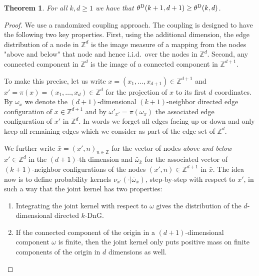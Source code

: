 \documentclass[oneside]{amsart}
\newtheorem{theorem}{Theorem}[section]
\theoremstyle{definition}
\newcommand{\1}{\mathbbm{1}}
\newcommand{\0}{\mathbf{o}}
\newcommand{\Z}{\mathbb{Z}}
\numberwithin{equation}{section}
\begin{document}
\begin{theorem}\label{theorem-3322}
For all $k,d\ge1$ we have that $\theta^{\rm D}(k+1,d+1)\ge \theta^{\rm D}(k,d)$.
\end{theorem}
\begin{proof}
We use a randomized coupling approach. The coupling is designed to have the following two key properties. First, using the additional dimension, the edge distribution of a node in $\Z^d$ is the image measure of a mapping from the nodes "above and below" that node and hence i.i.d.\ over the nodes in $\Z^d$. Second, any connected component in $\Z^d$ is the image of a connected component in $\Z^{d+1}$.

To make this precise, let us write $x=(x_1,\dots,x_{d+1})\in \Z^{d+1}$ and $x'=\pi(x)=(x_1,\dots, x_d)\in \Z^d$ for the projection of $x$ to its first $d$ coordinates. By $\omega_{x}$ we denote the $(d+1)$-dimensional $(k+1)$-neighbor directed edge configuration of $x\in \Z^{d+1}$ and by $\omega'_{x'}=\pi(\omega_{x})$ the associated edge configuration of $x'$ in $\Z^d$. In words we forget all edges facing up or down and only keep all remaining edges which we consider as part of the edge set of $\Z^d$. 

We further write $\bar x=(x',n)_{n\in\Z}$ for the vector of nodes {\em above and below} $x'\in \Z^d$ in the $(d+1)$-th dimension and $\bar\omega_{\bar x}$ for the associated vector of $(k+1)$-neighbor configurations of the nodes $(x',n)\in \Z^{d+1}$ in $\bar x$. The idea now is to define probability kernels $\nu_{x'}(\cdot|\bar\omega_{\bar x})$, step-by-step with respect to $x'$, in such a way that the joint kernel has two properties:
\begin{enumerate}
\item Integrating the joint kernel with respect to $\omega$ gives the distribution of the $d$-dimensional directed $k$-DnG. 
\item If the connected component of the origin in a $(d+1)$-dimensional component $\omega$ is finite, then the joint kernel only puts positive mass on finite components of the origin in $d$ dimensions as well. 
\end{enumerate}


\end{proof}
\end{document}
